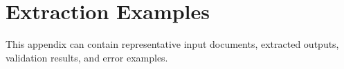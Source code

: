\chapter{Extraction Examples}
\label{app:examples}

This appendix can contain representative input documents, extracted outputs, validation results, and error examples.
